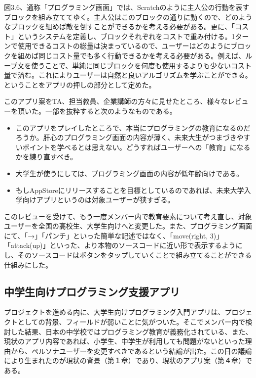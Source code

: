 \documentclass[openany,11pt,papersize]{jsbook}
\begin{document}
\par 図3.6、通称「プログラミング画面」では、Scratchのように主人公の行動を表すブロックを組み立ててゆく。主人公はこのブロックの通りに動くので、どのようなブロックを組めば敵を倒すことができるかを考える必要がある。更に、「コスト」というシステムを定義し、ブロックそれぞれをコストで重み付ける。1ターンで使用できるコストの総量は決まっているので、ユーザーはどのようにブロックを組めば同じコスト量でも多く行動できるかを考える必要がある。例えば、ループ文を使うことで、単純に同じブロックを何度も使用するよりも少ないコスト量で済む。これによりユーザーは自然と良いアルゴリズムを学ぶことができる。ということをアプリの押しの部分として定めた。
\par このアプリ案をTA、担当教員、企業講師の方々に見せたところ、様々なレビューを頂いた。一部を抜粋すると次のようなものである。
\begin{itemize}
 \item このアプリをプレイしたところで、本当にプログラミングの教育になるのだろうか。肝心のプログラミング画面の内容が薄く、未来大生がつまづきやすいポイントを学べるとは思えない。どうすればユーザーへの「教育」になるかを練り直すべき。
 \item 大学生が使うにしては、プログラミング画面の内容が低年齢向けである。
 \item もしAppStoreにリリースすることを目標としているのであれば、未来大学入学向けアプリというのは対象ユーザーが狭すぎる。
 \end{itemize}
\par このレビューを受けて、もう一度メンバー内で教育要素について考え直し、対象ユーザーを全国の高校生、大学生向けへと変更した。また、プログラミング画面にて、「→」「パンチ」といった簡単な記述ではなく、「move(right, 3)」「attack(up)」といった、より本物のソースコードに近い形で表示するようにし、そのソースコードはボタンをタップしていくことで組み立てることができる仕組みにした。
 
 \subsection{中学生向けプログラミング支援アプリ}
\par プロジェクトを進める内に、大学生向けプログラミング入門アプリは、プロジェクトとしての背景、フィールドが弱いことに気がついた。そこでメンバー内で検討した結果、日本の中学校ではプログラミング教育が義務化されている、また、現状のアプリ内容であれば、小学生、中学生が利用しても問題がないといった理由から、ペルソナユーザーを変更すべきであるという結論が出た。この日の議論により生まれたのが現状の背景（第１章）であり、現状のアプリ案（第４章）である。
\end{document}
